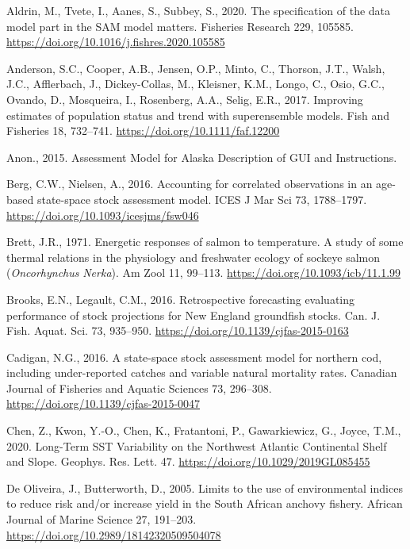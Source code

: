 \documentclass[]{article}
\begin{document}
\leavevmode\hypertarget{ref-aldrin2020Specification}{}%
Aldrin, M., Tvete, I., Aanes, S., Subbey, S., 2020. The specification of
the data model part in the SAM model matters. Fisheries Research 229,
105585. \url{https://doi.org/10.1016/j.fishres.2020.105585}

\leavevmode\hypertarget{ref-anderson2017Improving}{}%
Anderson, S.C., Cooper, A.B., Jensen, O.P., Minto, C., Thorson, J.T.,
Walsh, J.C., Afflerbach, J., Dickey-Collas, M., Kleisner, K.M., Longo,
C., Osio, G.C., Ovando, D., Mosqueira, I., Rosenberg, A.A., Selig, E.R.,
2017. Improving estimates of population status and trend with
superensemble models. Fish and Fisheries 18, 732--741.
\url{https://doi.org/10.1111/faf.12200}

\leavevmode\hypertarget{ref-anon2015AMAK}{}%
Anon., 2015. Assessment Model for Alaska Description of GUI and
Instructions.

\leavevmode\hypertarget{ref-berg2016Accounting}{}%
Berg, C.W., Nielsen, A., 2016. Accounting for correlated observations in
an age-based state-space stock assessment model. ICES J Mar Sci 73,
1788--1797. \url{https://doi.org/10.1093/icesjms/fsw046}

\leavevmode\hypertarget{ref-brett1971Energetic}{}%
Brett, J.R., 1971. Energetic responses of salmon to temperature. A study
of some thermal relations in the physiology and freshwater ecology of
sockeye salmon (\emph{Oncorhynchus} \emph{Nerka}). Am Zool 11, 99--113.
\url{https://doi.org/10.1093/icb/11.1.99}

\leavevmode\hypertarget{ref-brooks2016Retrospective}{}%
Brooks, E.N., Legault, C.M., 2016. Retrospective forecasting evaluating
performance of stock projections for New England groundfish stocks. Can.
J. Fish. Aquat. Sci. 73, 935--950.
\url{https://doi.org/10.1139/cjfas-2015-0163}

\leavevmode\hypertarget{ref-cadigan2016Statespace}{}%
Cadigan, N.G., 2016. A state-space stock assessment model for northern
cod, including under-reported catches and variable natural mortality
rates. Canadian Journal of Fisheries and Aquatic Sciences 73, 296--308.
\url{https://doi.org/10.1139/cjfas-2015-0047}

\leavevmode\hypertarget{ref-chen2020Long}{}%
Chen, Z., Kwon, Y.-O., Chen, K., Fratantoni, P., Gawarkiewicz, G.,
Joyce, T.M., 2020. Long-Term SST Variability on the Northwest Atlantic
Continental Shelf and Slope. Geophys. Res. Lett. 47.
\url{https://doi.org/10.1029/2019GL085455}

\leavevmode\hypertarget{ref-deoliveira2005Limits}{}%
De Oliveira, J., Butterworth, D., 2005. Limits to the use of
environmental indices to reduce risk and/or increase yield in the South
African anchovy fishery. African Journal of Marine Science 27, 191--203.
\url{https://doi.org/10.2989/18142320509504078}
\end{document}
